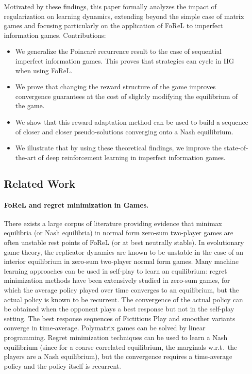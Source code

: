 Motivated by these findings, this paper formally analyzes the impact of regularization on learning dynamics, extending beyond the simple case of matrix games and focusing particularly on the application of FoReL to imperfect information games. Contributions:
\begin{itemize}
\item We generalize the Poincar\'e recurrence result to the case of sequential imperfect information games. This proves that strategies can cycle in IIG when using FoReL.
\item We prove that changing the reward structure of the game improves convergence guarantees at the cost of slightly modifying the equilibrium of the game.
\item We show that this reward adaptation method can be used to build a sequence of closer and closer pseudo-solutions converging onto a Nash equilibrium.
\item We illustrate that by using these theoretical findings, we improve the state-of-the-art of deep reinforcement learning in imperfect information games.
\end{itemize}

\subsection{Related Work}

\paragraph{FoReL and regret minimization in Games.}
There exists a large corpus of literature providing evidence that minimax equilibria (or Nash equilibria) in normal form zero-sum two-player games are often unstable rest points of FoReL (or at best neutrally stable). In evolutionary game theory, the replicator dynamics are known to be unstable in the case of an interior equilibrium in zero-sum two-player normal form games. Many machine learning approaches can be used in self-play to learn an equilibrium: regret minimization methods have been extensively studied in zero-sum games, for which the average policy played over time converges to an equilibrium, but the actual policy is known to be recurrent. The convergence of the actual policy can be obtained when the opponent plays a best response but not in the self-play setting. The best response sequences of Fictitious Play and smoother variants converge in time-average. Polymatrix games can be solved by linear programming. Regret minimization techniques can be used to learn a Nash equilibrium (since for a coarse correlated equilibrium, the marginals w.r.t.\ the players are a Nash equilibrium), but the convergence requires a time-average policy and the policy itself is recurrent.


